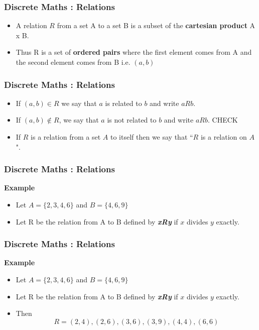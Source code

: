 \documentclass{beamer}
\begin{document}

\begin{frame}
\frametitle{Discrete Maths : Relations}
\Large
\begin{itemize}
\item A relation $R$ from a set A to a set B is a subset of the
\textbf{cartesian product} A x B. 
\item Thus R is a set of \textbf{ordered pairs} where
the first element comes from A and the second element comes
from B i.e. $(a, b)$
\end{itemize}
\end{frame}
\begin{frame}
\frametitle{Discrete Maths : Relations}
\Large
\begin{itemize}

\item  If $(a, b) \in R$ we say that $a$ is related to $b$ and write $aRb$.
\item If $(a, b) \notin R$, we say that $a$ is not related to $b$ and write $aRb$. CHECK
\item If
$R$ is a relation from a set $A$ to itself then we say that ``$R$ is a relation
on $A$".
\end{itemize}
\end{frame}
\begin{frame}
\frametitle{Discrete Maths : Relations}
\Large
\vspace{-2cm}
\textbf{Example}
\begin{itemize}
\item Let $A = \{2, 3, 4, 6\}$ and $B = \{4, 6, 9\}$
\item Let R be the relation from A to B defined by \textit{\textbf{xRy}} if $x$
divides $y$ exactly.
\end{itemize}

\end{frame}
\begin{frame}
\frametitle{Discrete Maths : Relations}
\Large
\vspace{-0.7cm}
\textbf{Example}
\begin{itemize}

\item Let $A = \{2, 3, 4, 6\}$ and $B = \{4, 6, 9\}$
\item Let R be the relation from A to B defined by \textit{\textbf{xRy}} if $x$
divides $y$ exactly.
\item  Then
\[R = {(2, 4), (2, 6), (3, 6), (3, 9), (4, 4), (6, 6)}\]
\end{itemize}

\end{frame}
\end{document}

